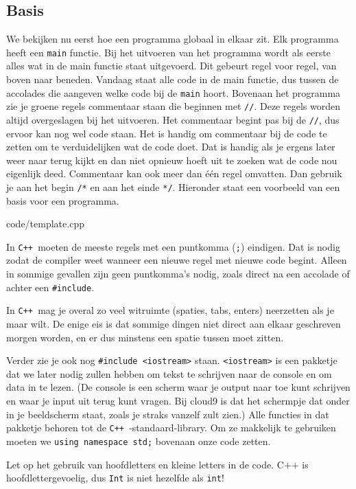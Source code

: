 \documentclass[12pt,a4paper]{article}
\newcommand{\code}{}
\newcommand{\icode}{\lstinline}
\newcommand{\mono}{\texttt}
\newcommand{\cpp}{\mono{C++ }}
\begin{document}
\subsection{Basis}
We bekijken nu eerst hoe een programma globaal in elkaar zit.  Elk programma heeft een \icode{main} functie. Bij het uitvoeren van het programma wordt als eerste alles wat in de main functie staat uitgevoerd. Dit gebeurt regel voor regel, van boven naar beneden. Vandaag staat alle code in de main functie, dus tussen de accolades die aangeven welke code bij de \icode{main} hoort.
Bovenaan het programma zie je groene regels commentaar staan die beginnen met \icode{//}. Deze regels worden altijd overgeslagen bij het uitvoeren. Het commentaar begint pas bij de \icode{//}, dus ervoor kan nog wel code staan. Het is handig om commentaar bij de code te zetten om te verduidelijken wat de code doet. Dat is handig als je ergens later weer naar terug kijkt en dan niet opnieuw hoeft uit te zoeken wat de code nou eigenlijk deed. Commentaar kan ook meer dan \'e\'en regel omvatten. Dan gebruik je aan het begin \icode{/*} en aan het einde \icode{*/}. Hieronder staat een voorbeeld van een basis voor een programma. 

\code{code/template.cpp}

In \cpp moeten de meeste regels met een puntkomma (\icode{;}) eindigen. Dat is nodig zodat de compiler weet wanneer een nieuwe regel met nieuwe code begint. Alleen in sommige gevallen zijn geen puntkomma's nodig, zoals direct na een accolade of achter een \icode{#include}.

In \cpp  mag je overal zo veel witruimte (spaties, tabs, enters) neerzetten als je maar wilt. De enige eis is dat sommige dingen niet direct aan elkaar geschreven morgen worden, en er dus minstens een spatie tussen moet zitten.


Verder zie je ook nog \icode{#include <iostream>} staan. \icode{<iostream>} is een pakketje dat we later nodig zullen hebben om tekst te schrijven naar de console en om data in te lezen.
(De console is een scherm waar je output naar toe kunt schrijven en waar je input uit terug kunt vragen. Bij cloud9 is dat het schermpje dat onder in je beeldscherm staat, zoals je straks vanzelf zult zien.)
Alle functies in dat pakketje behoren tot de \cpp-standaard-library. Om ze makkelijk te gebruiken moeten we \icode{using namespace std;} bovenaan onze code zetten.

Let op het gebruik van hoofdletters en kleine letters in de code. C++ is hoofdlettergevoelig, dus \icode{Int} is niet hezelfde als \icode{int}!
\end{document}

